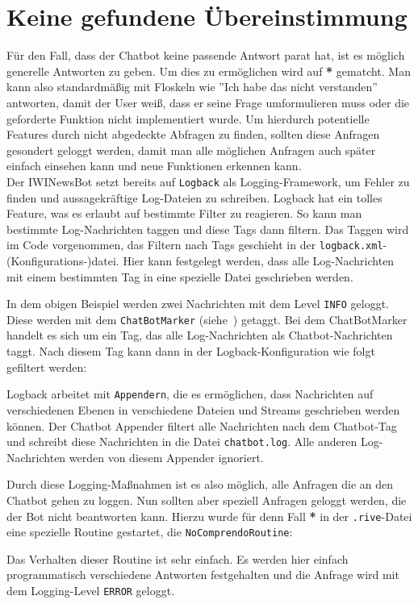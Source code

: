 \section{Keine gefundene Übereinstimmung}
Für den Fall, dass der Chatbot keine passende Antwort parat hat, ist es möglich generelle Antworten zu geben. Um dies zu ermöglichen wird auf \textbf{*} gematcht. Man kann also standardmäßig mit Floskeln wie ''Ich habe das nicht verstanden'' antworten, damit der User weiß, dass er seine Frage umformulieren muss oder die geforderte Funktion nicht implementiert wurde. Um hierdurch potentielle Features durch nicht abgedeckte Abfragen zu finden, sollten diese Anfragen gesondert geloggt werden, damit man alle möglichen Anfragen auch später einfach einsehen kann und neue Funktionen erkennen kann. \\
Der IWINewsBot setzt bereits auf \texttt{Logback} als Logging-Framework, um Fehler zu finden und aussagekräftige Log-Dateien zu schreiben. Logback hat ein tolles Feature, was es erlaubt auf bestimmte Filter zu reagieren. So kann man bestimmte Log-Nachrichten taggen und diese Tags dann filtern. Das Taggen wird im Code vorgenommen, das Filtern nach Tags geschieht in der \texttt{logback.xml}-(Konfigurations-)datei. Hier kann festgelegt werden, dass alle Log-Nachrichten mit einem bestimmten Tag in eine spezielle Datei geschrieben werden.


In dem obigen Beispiel werden zwei Nachrichten mit dem Level \texttt{INFO} geloggt. Diese werden mit dem \texttt{ChatBotMarker} (siehe~) getaggt. Bei dem ChatBotMarker handelt es sich um ein Tag, das alle Log-Nachrichten als Chatbot-Nachrichten taggt. Nach diesem Tag kann dann in der Logback-Konfiguration wie folgt gefiltert werden:


Logback arbeitet mit \texttt{Appendern}, die es ermöglichen, dass Nachrichten auf verschiedenen Ebenen in verschiedene Dateien und Streams geschrieben werden können. Der Chatbot Appender filtert alle Nachrichten nach dem Chatbot-Tag und schreibt diese Nachrichten in die Datei \texttt{chatbot.log}. Alle anderen Log-Nachrichten werden von diesem Appender ignoriert.

Durch diese Logging-Maßnahmen ist es also möglich, alle Anfragen die an den Chatbot gehen zu loggen. Nun sollten aber speziell Anfragen geloggt werden, die der Bot nicht beantworten kann. Hierzu wurde für denn Fall \textbf{*} in der \texttt{.rive}-Datei eine spezielle Routine gestartet, die \texttt{NoComprendoRoutine}:


Das Verhalten dieser Routine ist sehr einfach. Es werden hier einfach programmatisch verschiedene Antworten festgehalten und die Anfrage wird mit dem Logging-Level \texttt{ERROR} geloggt.
